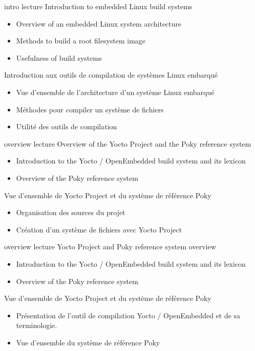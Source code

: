 \def \onsitelecturetimeratio{40}
\def \onsitelabtimeratio{60}


{intro}
{lecture}
{Introduction to embedded Linux build systems}
{
  \begin{itemize}
  \item Overview of an embedded Linux system architecture
  \item Methods to build a root filesystem image
  \item Usefulness of build systems
  \end{itemize}
}
{Introduction aux outils de compilation de systèmes Linux embarqué}
{
  \begin{itemize}
  \item Vue d'ensemble de l'architecture d'un système Linux embarqué
  \item Méthodes pour compiler un système de fichiers
  \item Utilité des outils de compilation
  \end{itemize}
}

{overview}
{lecture}
{Overview of the Yocto Project and the Poky reference system}
{
  \begin{itemize}
  \item Introduction to the Yocto / OpenEmbedded build system and its lexicon
  \item Overview of the Poky reference system
  \end{itemize}
}
{Vue d'ensemble de Yocto Project et du système de référence Poky}
{
  \begin{itemize}
  \item Organisation des sources du projet
  \item Création d'un système de fichiers avec Yocto Project
  \end{itemize}
}

{overview}
{lecture}
{Yocto Project and Poky reference system overview}
{
  \begin{itemize}
  \item Introduction to the Yocto / OpenEmbedded build system and its lexicon
  \item Overview of the Poky reference system
  \end{itemize}
}
{Vue d'ensemble de Yocto Project et du système de référence Poky}
{
  \begin{itemize}
  \item Présentation de l'outil de compilation Yocto / OpenEmbedded et de sa terminologie.
  \item Vue d'ensemble du système de référence Poky
  \end{itemize}
}

